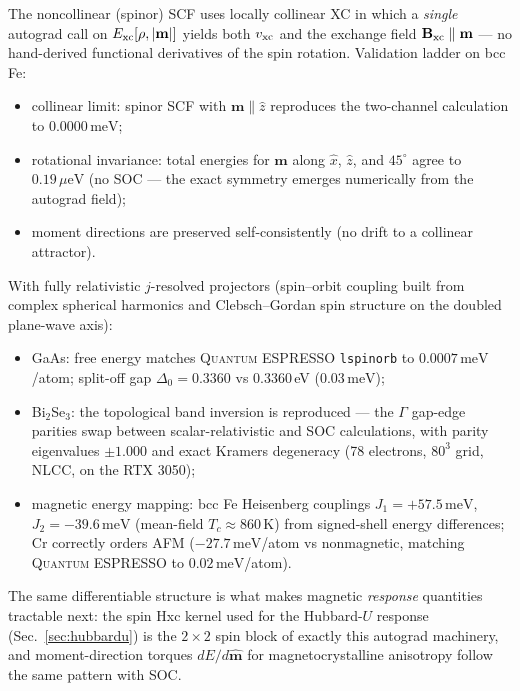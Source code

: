\documentclass[11pt]{article}
\newcommand{\qe}{\textsc{Quantum ESPRESSO}}
\newcommand{\meV}{\,\mathrm{meV}}
\newcommand{\ueV}{\,\mu\mathrm{eV}}
\begin{document}
The noncollinear (spinor) SCF uses locally collinear XC in which a
\emph{single} autograd call on $E_{\rm xc}[\rho, |\mathbf{m}|]$ yields both
$v_{\rm xc}$ and the exchange field $\mathbf{B}_{\rm xc} \parallel \mathbf{m}$
--- no hand-derived functional derivatives of the spin rotation. Validation
ladder on bcc Fe:

\begin{itemize}
\item collinear limit: spinor SCF with $\mathbf{m} \parallel \hat z$
  reproduces the two-channel calculation to $0.0000\meV$;
\item rotational invariance: total energies for $\mathbf{m}$ along
  $\hat x$, $\hat z$, and $45^\circ$ agree to $0.19\ueV$ (no SOC ---
  the exact symmetry emerges numerically from the autograd field);
\item moment directions are preserved self-consistently (no drift to a
  collinear attractor).
\end{itemize}

With fully relativistic $j$-resolved projectors (spin--orbit coupling built
from complex spherical harmonics and Clebsch--Gordan spin structure on the
doubled plane-wave axis):

\begin{itemize}
\item GaAs: free energy matches \qe{} \texttt{lspinorb} to $0.0007\meV$/atom;
  split-off gap $\Delta_0 = 0.3360$ vs 0.3360\,eV ($0.03\meV$);
\item Bi$_2$Se$_3$: the topological band inversion is reproduced --- the
  $\Gamma$ gap-edge parities swap between scalar-relativistic and SOC
  calculations, with parity eigenvalues $\pm 1.000$ and exact Kramers
  degeneracy (78 electrons, $80^3$ grid, NLCC, on the RTX 3050);
\item magnetic energy mapping: bcc Fe Heisenberg couplings
  $J_1 = +57.5\meV$, $J_2 = -39.6\meV$ (mean-field $T_c \approx 860$\,K)
  from signed-shell energy differences; Cr correctly orders AFM
  ($-27.7\meV$/atom vs nonmagnetic, matching \qe{} to $0.02\meV$/atom).
\end{itemize}

The same differentiable structure is what makes magnetic \emph{response}
quantities tractable next: the spin Hxc kernel used for the Hubbard-$U$
response (Sec.~\ref{sec:hubbardu}) is the $2\times2$ spin block of exactly
this autograd machinery, and moment-direction torques $dE/d\hat{\mathbf{m}}$
for magnetocrystalline anisotropy follow the same pattern with SOC.
\end{document}
